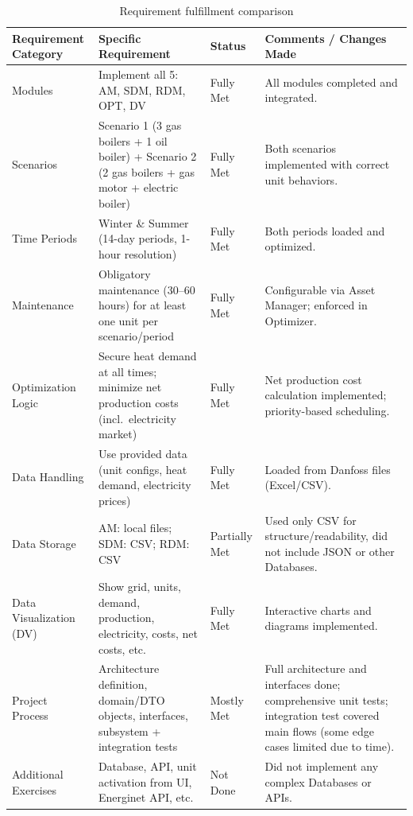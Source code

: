 \begin{table}[H]
    \centering
    \small
    \renewcommand{\arraystretch}{1.2}
    \caption{Requirement fulfillment comparison}
    \label{tab:requirements-comparison}
    \begin{tabular}{p{} p{} p{} p{}}
        \toprule
        \textbf{Requirement Category} & \textbf{Specific Requirement} & \textbf{Status} & \textbf{Comments / Changes Made} \\
        \midrule
        Modules & Implement all 5: AM, SDM, RDM, OPT, DV & Fully Met & All modules completed and integrated. \\
        Scenarios & Scenario 1 (3 gas boilers + 1 oil boiler) + Scenario 2 (2 gas boilers + gas motor + electric boiler) & Fully Met & Both scenarios implemented with correct unit behaviors. \\
        Time Periods & Winter \& Summer (14-day periods, 1-hour resolution) & Fully Met & Both periods loaded and optimized. \\
        Maintenance & Obligatory maintenance (30--60 hours) for at least one unit per scenario/period & Fully Met & Configurable via Asset Manager; enforced in Optimizer. \\
        Optimization Logic & Secure heat demand at all times; minimize net production costs (incl.\ electricity market) & Fully Met & Net production cost calculation implemented; priority-based scheduling. \\
        Data Handling & Use provided data (unit configs, heat demand, electricity prices) & Fully Met & Loaded from Danfoss files (Excel/CSV). \\
        Data Storage & AM: local files; SDM: CSV; RDM: CSV & Partially Met & Used only CSV for structure/readability, did not include JSON or other Databases. \\
        Data Visualization (DV) & Show grid, units, demand, production, electricity, costs, net costs, etc. & Fully Met & Interactive charts and diagrams implemented. \\
        Project Process & Architecture definition, domain/DTO objects, interfaces, subsystem + integration tests & Mostly Met & Full architecture and interfaces done; comprehensive unit tests; integration test covered main flows (some edge cases limited due to time). \\
        Additional Exercises & Database, API, unit activation from UI, Energinet API, etc. & Not Done & Did not implement any complex Databases or APIs. \\
        \bottomrule
    \end{tabular}
\end{table}

